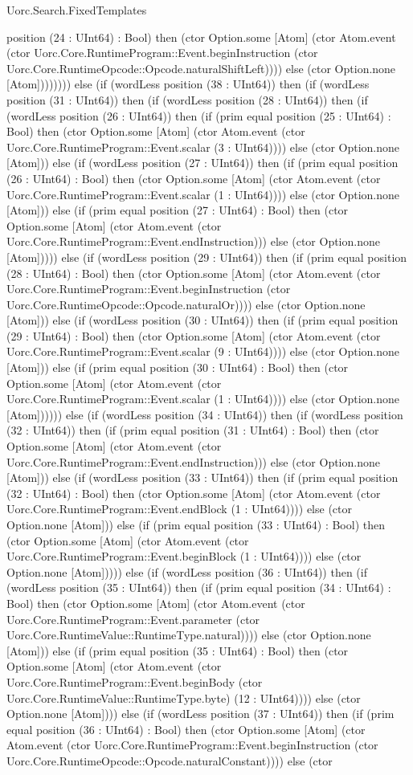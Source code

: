 \begin{lexlean}{Uorc.Search.FixedTemplates}
\begin{semanticmodule}
{position (24 : UInt64) : Bool) then (ctor Option.some [Atom] (ctor Atom.event (ctor Uorc.Core.RuntimeProgram::Event.beginInstruction (ctor Uorc.Core.RuntimeOpcode::Opcode.naturalShiftLeft)))) else (ctor Option.none [Atom]))))))) else (if (wordLess position (38 : UInt64)) then (if (wordLess position (31 : UInt64)) then (if (wordLess position (28 : UInt64)) then (if (wordLess position (26 : UInt64)) then (if (prim equal position (25 : UInt64) : Bool) then (ctor Option.some [Atom] (ctor Atom.event (ctor Uorc.Core.RuntimeProgram::Event.scalar (3 : UInt64)))) else (ctor Option.none [Atom])) else (if (wordLess position (27 : UInt64)) then (if (prim equal position (26 : UInt64) : Bool) then (ctor Option.some [Atom] (ctor Atom.event (ctor Uorc.Core.RuntimeProgram::Event.scalar (1 : UInt64)))) else (ctor Option.none [Atom])) else (if (prim equal position (27 : UInt64) : Bool) then (ctor Option.some [Atom] (ctor Atom.event (ctor Uorc.Core.RuntimeProgram::Event.endInstruction))) else (ctor Option.none [Atom])))) else (if (wordLess position (29 : UInt64)) then (if (prim equal position (28 : UInt64) : Bool) then (ctor Option.some [Atom] (ctor Atom.event (ctor Uorc.Core.RuntimeProgram::Event.beginInstruction (ctor Uorc.Core.RuntimeOpcode::Opcode.naturalOr)))) else (ctor Option.none [Atom])) else (if (wordLess position (30 : UInt64)) then (if (prim equal position (29 : UInt64) : Bool) then (ctor Option.some [Atom] (ctor Atom.event (ctor Uorc.Core.RuntimeProgram::Event.scalar (9 : UInt64)))) else (ctor Option.none [Atom])) else (if (prim equal position (30 : UInt64) : Bool) then (ctor Option.some [Atom] (ctor Atom.event (ctor Uorc.Core.RuntimeProgram::Event.scalar (1 : UInt64)))) else (ctor Option.none [Atom]))))) else (if (wordLess position (34 : UInt64)) then (if (wordLess position (32 : UInt64)) then (if (prim equal position (31 : UInt64) : Bool) then (ctor Option.some [Atom] (ctor Atom.event (ctor Uorc.Core.RuntimeProgram::Event.endInstruction))) else (ctor Option.none [Atom])) else (if (wordLess position (33 : UInt64)) then (if (prim equal position (32 : UInt64) : Bool) then (ctor Option.some [Atom] (ctor Atom.event (ctor Uorc.Core.RuntimeProgram::Event.endBlock (1 : UInt64)))) else (ctor Option.none [Atom])) else (if (prim equal position (33 : UInt64) : Bool) then (ctor Option.some [Atom] (ctor Atom.event (ctor Uorc.Core.RuntimeProgram::Event.beginBlock (1 : UInt64)))) else (ctor Option.none [Atom])))) else (if (wordLess position (36 : UInt64)) then (if (wordLess position (35 : UInt64)) then (if (prim equal position (34 : UInt64) : Bool) then (ctor Option.some [Atom] (ctor Atom.event (ctor Uorc.Core.RuntimeProgram::Event.parameter (ctor Uorc.Core.RuntimeValue::RuntimeType.natural)))) else (ctor Option.none [Atom])) else (if (prim equal position (35 : UInt64) : Bool) then (ctor Option.some [Atom] (ctor Atom.event (ctor Uorc.Core.RuntimeProgram::Event.beginBody (ctor Uorc.Core.RuntimeValue::RuntimeType.byte) (12 : UInt64)))) else (ctor Option.none [Atom]))) else (if (wordLess position (37 : UInt64)) then (if (prim equal position (36 : UInt64) : Bool) then (ctor Option.some [Atom] (ctor Atom.event (ctor Uorc.Core.RuntimeProgram::Event.beginInstruction (ctor Uorc.Core.RuntimeOpcode::Opcode.naturalConstant)))) else (ctor }
\end{semanticmodule}
\end{lexlean}
